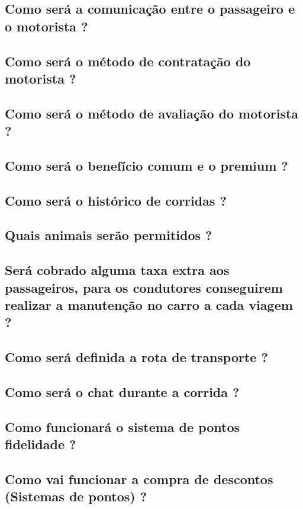 \begin{apendicesenv}
\subsection{Como será a comunicação entre o passageiro e o motorista ?}
\label{p9}
\subsection{Como será o método de contratação do motorista ?}
\label{p10}
\subsection{Como será o método de avaliação do motorista ?}
\label{p11}
\subsection{Como será o benefício comum e o premium ?}
\label{p12}
\subsection{Como será o histórico de corridas ?}
\label{p13}
\subsection{Quais animais serão permitidos ?}
\label{p14}
\subsection{Será cobrado alguma taxa extra aos passageiros, para os condutores conseguirem realizar a manutenção no carro a cada viagem ?}
\label{p15}
\subsection{Como será definida a rota de transporte ?}
\label{p16}
\subsection{Como será o chat durante a corrida ?}
\label{p17}
\subsection{Como funcionará o sistema de pontos fidelidade ?}
\label{p18}
\subsection{Como vai funcionar a compra de descontos (Sistemas de pontos)  ?}\label{p19}


\end{apendicesenv}
